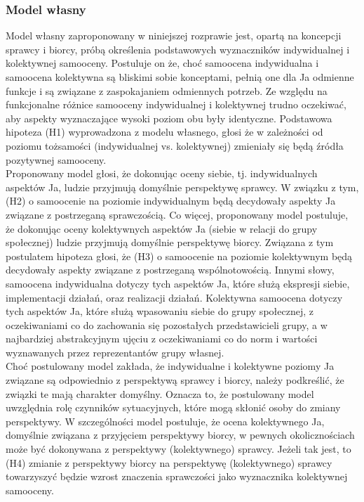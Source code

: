 \documentclass[man]{apa6}
\begin{document}
\subsubsection{Model własny}
Model własny zaproponowany w niniejszej rozprawie jest, opartą na koncepcji sprawcy i biorcy, próbą określenia podstawowych wyznaczników indywidualnej i kolektywnej samooceny. Postuluje on że, choć samoocena indywidualna i samoocena kolektywna są bliskimi sobie konceptami, pełnią one dla Ja odmienne funkcje i są związane z zaspokajaniem odmiennych potrzeb. Ze względu na funkcjonalne różnice samooceny indywidualnej i kolektywnej trudno oczekiwać, aby aspekty wyznaczające wysoki poziom obu były identyczne. Podstawowa hipoteza (H1) wyprowadzona z modelu własnego, głosi że w zależności od poziomu tożsamości (indywidualnej vs. kolektywnej) zmieniały się będą źródła pozytywnej samooceny.\\

Proponowany model głosi, że dokonując oceny siebie, tj. indywidualnych aspektów Ja, ludzie przyjmują domyślnie perspektywę sprawcy. W związku z tym, (H2) o samoocenie na poziomie indywidualnym będą decydowały aspekty Ja związane z postrzeganą sprawczością. Co więcej, proponowany model postuluje, że dokonując oceny kolektywnych aspektów Ja (siebie w relacji do grupy społecznej) ludzie przyjmują domyślnie perspektywę biorcy. Związana z tym postulatem hipoteza głosi, że (H3) o samoocenie na poziomie kolektywnym będą decydowały aspekty związane z postrzeganą wspólnotowością. Innymi słowy, samoocena indywidualna dotyczy tych aspektów Ja, które służą ekspresji siebie, implementacji działań, oraz realizacji działań. Kolektywna samoocena dotyczy tych aspektów Ja, które służą wpasowaniu siebie do grupy społecznej, z oczekiwaniami co do zachowania się pozostałych przedstawicieli grupy, a w najbardziej abstrakcyjnym ujęciu z oczekiwaniami co do norm i wartości wyznawanych przez reprezentantów grupy własnej.\\

Choć postulowany model zakłada, że indywidualne i kolektywne poziomy Ja związane są odpowiednio z perspektywą sprawcy i biorcy, należy podkreślić, że związki te mają charakter domyślny. Oznacza to, że postulowany model uwzględnia rolę czynników sytuacyjnych, które mogą skłonić osoby do zmiany perspektywy. W szczególności model postuluje, że ocena kolektywnego Ja, domyślnie związana z przyjęciem perspektywy biorcy, w pewnych okolicznościach może być dokonywana z perspektywy (kolektywnego) sprawcy. Jeżeli tak jest, to (H4) zmianie z perspektywy biorcy na perspektywę (kolektywnego) sprawcy towarzyszyć będzie wzrost znaczenia sprawczości jako wyznacznika kolektywnej samooceny.\\
\end{document}
